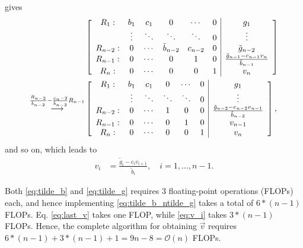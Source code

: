 \documentclass[english,notitlepage,reprint,nofootinbib]{revtex4-2}  %
\begin{document}
\begin{widetext}
gives 
\begin{align}
    &\left[\begin{array}{cccccc|c}
        R_1: & b_1 & c_1 & 0 & \cdots & 0  & g_1\\
        \ & \vdots & \ddots & \ddots & \ddots & 0  & \vdots \\
        R_{n-2}:   & 0 & \cdots & \tilde{b}_{n-2} & c_{n-2} & 0 & \tilde{g}_{n-2} \\
        R_{n-1}: & 0 & \cdots & 0 & 1 & 0 & \frac{\tilde{g}_{n-1} - c_{n-1}v_{n}}{\tilde{b}_{n-1}} \\
        R_{n}: & 0 & \cdots & 0 & 0 & 1 & v_{n}
    \end{array}\right]
    \notag \\
    \overset{\frac{R_{n-2}}{\tilde{b}_{n-2}}-\frac{c_n-2}{\tilde{b}_{n-2}}R_{n-1}}{\longrightarrow} 
    &\left[\begin{array}{cccccc|c}
        R_1: & b_1 & c_1 & 0 & \cdots & 0  & g_1\\
        \ & \vdots & \ddots & \ddots & \ddots & 0  & \vdots \\
        R_{n-2}:   & 0 & \cdots & 1 & 0 & 0 & \frac{\tilde{g}_{n-2} - c_{n-2}v_{n-1}}{\tilde{b}_{n-2}} \\
        R_{n-1}: & 0 & \cdots & 0 & 1 & 0 & v_{n-1} \\
        R_{n}: & 0 & \cdots & 0 & 0 & 1 & v_{n}
    \end{array}\right],
\end{align}
and so on, which leads to  
\begin{align}
    v_{i}   &= \frac{\tilde{g}_{i}-c_{i}v_{i+1}}{\tilde{b}_{i}}, \quad i=1, ..., n-1.   \label{eq:v_i}
\end{align}
\end{widetext}

Both \eqref{eq:tilde_b} and \eqref{eq:tilde_g} requires \(3\) floating-point operations (FLOPs) each, and hence implementing \eqref{eq:tilde_b_ntilde_g} takes a total of \(6*(n-1)\) FLOPs. Eq. \eqref{eq:last_v} takes one FLOP, while \eqref{eq:v_i} takes \(3*(n-1)\) FLOPs. Hence, the complete algorithm for obtaining \(\vec{v}\) requires \({6*(n-1) + 3*(n-1) + 1= 9n-8=\mathcal{O}(n)}\) FLOPs.
\end{document}
